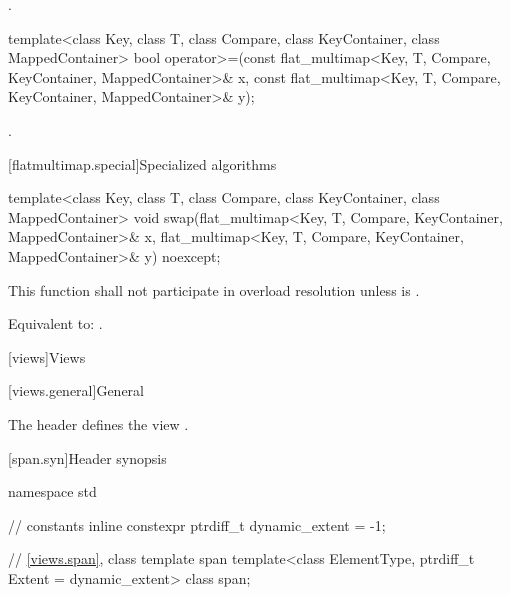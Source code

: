 \begin{codeblock}
\begin{codeblock}
\begin{codeblock}
\begin{addedblock}
\begin{itemdescr}
\pnum \returns {}.
\end{itemdescr}

%
\begin{itemdecl}
template<class Key, class T, class Compare, class KeyContainer, class MappedContainer>
  bool operator>=(const flat_multimap<Key, T, Compare, KeyContainer, MappedContainer>& x,
                  const flat_multimap<Key, T, Compare, KeyContainer, MappedContainer>& y);
\end{itemdecl}

\begin{itemdescr}
\pnum \returns {}.
\end{itemdescr}

[flatmultimap.special]{Specialized algorithms}

%
\begin{itemdecl}
template<class Key, class T, class Compare, class KeyContainer, class MappedContainer>
  void swap(flat_multimap<Key, T, Compare, KeyContainer, MappedContainer>& x,
            flat_multimap<Key, T, Compare, KeyContainer, MappedContainer>& y) noexcept;
\end{itemdecl}

\begin{itemdescr}
\pnum
\remarks
This function shall not participate in overload resolution
unless 
is .

\pnum
\effects Equivalent to: .
\end{itemdescr}
\end{addedblock}

[views]{Views}

[views.general]{General}

\pnum
The header  defines the view .

[span.syn]{Header  synopsis}%
%

\begin{codeblock}
namespace std {
  // constants
  inline constexpr ptrdiff_t dynamic_extent = -1;

  // \ref{views.span}, class template span
  template<class ElementType, ptrdiff_t Extent = dynamic_extent>
    class span;

}
\end{codeblock}
\end{codeblock}
\end{codeblock}
\end{codeblock}
